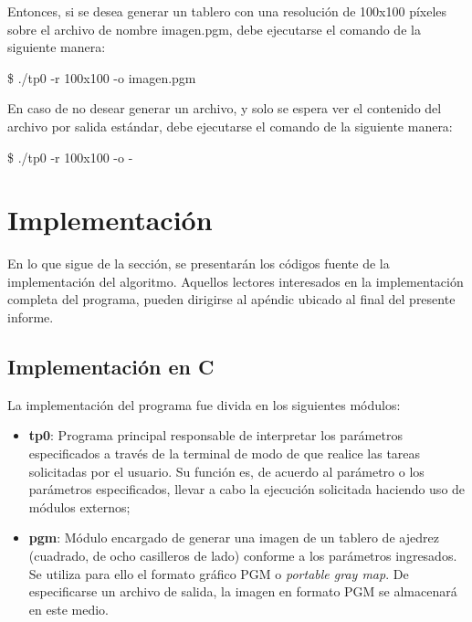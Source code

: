 \documentclass{article}
\begin{document}
	Entonces, si se desea generar un tablero con una resolución de 100x100 píxeles sobre el archivo de nombre imagen.pgm, debe ejecutarse el comando de la siguiente manera:
	\bigskip

	{\ttfamily\footnotesize
	\$ ./tp0  -r 100x100 -o imagen.pgm\\}

	En caso de no desear generar un archivo, y solo se espera ver el contenido del archivo por salida estándar, debe ejecutarse el comando de la siguiente manera:
	\bigskip

	{\ttfamily\footnotesize
	\$ ./tp0  -r 100x100 -o -\\}
\medskip




\section{Implementación}
	
	En lo que sigue de la sección, se presentarán los códigos fuente de la implementación del algoritmo. Aquellos lectores interesados en la implementación completa del programa, pueden dirigirse al apéndic ubicado al final del presente informe.
\bigskip



\subsection{Implementación en C}

	La implementación del programa fue divida en los siguientes módulos:
	\medskip

\begin{itemize}

\itemsep=2pt \topsep=0pt \partopsep=0pt \parskip=2pt \parsep=0pt
	\item \textbf{tp0}: Programa principal responsable de interpretar los parámetros especificados a través de la terminal de modo de que realice las tareas solicitadas por el usuario. Su función es, de acuerdo al parámetro o los parámetros especificados, llevar a cabo la ejecución solicitada haciendo uso de módulos externos;
	\item \textbf{pgm}: Módulo encargado de generar una imagen de un tablero de ajedrez (cuadrado, de ocho casilleros de lado) conforme a los parámetros ingresados. Se utiliza para ello el formato gráfico PGM o \textit{portable gray map}. De especificarse un archivo de salida, la imagen en formato PGM se almacenará en este medio.

\end{itemize}	
\bigskip
\end{document}
